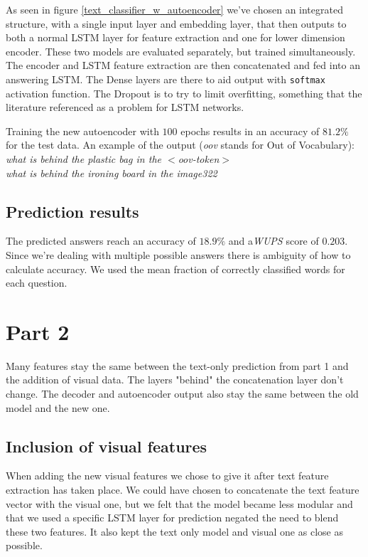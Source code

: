 \documentclass[10pt,a4paper]{report}
\begin{document}
	As seen in figure \ref{text_classifier_w_autoencoder} we've chosen an integrated structure, with a single input layer and embedding layer, that then outputs to both a normal LSTM layer for feature extraction and one for lower dimension encoder. These two models are evaluated separately, but trained simultaneously. The encoder and LSTM feature extraction are then concatenated and fed into an answering LSTM. The Dense layers are there to aid output with \texttt{softmax} activation function. The Dropout is to try to limit overfitting, something that the literature referenced as a problem for LSTM networks.
	
	Training the new autoencoder with $ 100 $ epochs results in an accuracy of $ 81.2 \%$ for the test data.  An example of the output (\textit{oov} stands for Out of Vocabulary):
	\\\textit{what is behind the plastic bag in the $ < $oov-token$ > $
	\\ what is behind the ironing board in the image322  }

	\subsection*{Prediction results}
	The predicted answers reach an accuracy of $ 18.9 \% $ and a\textit{WUPS} score of  $ 0.203 $. Since we're dealing with multiple possible answers there is ambiguity of how to calculate accuracy. We used the mean fraction of correctly classified words for each question.


\pagebreak



	\section*{Part 2}
	Many features stay the same between the text-only prediction from part 1 and the addition of visual data. The layers "behind" the concatenation layer don't change. The decoder and autoencoder output also stay the same between the old model and the new one.
	\subsection*{Inclusion of visual features}
	When adding the new visual features we chose to give it after text feature extraction has taken place. We could have chosen to concatenate the text feature vector with the visual one, but we felt that the model became less modular and that we used a specific LSTM layer for prediction negated the need to blend these two features. It also kept the text only model and visual one as close as possible. 
\end{document}
